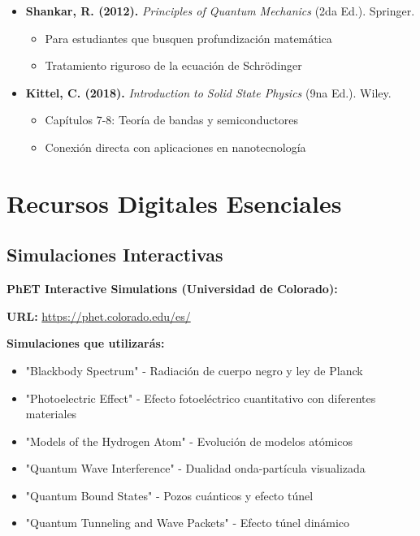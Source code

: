 \begin{tecnologiabox}
\begin{tecnologiabox}
\begin{tecnologiabox}
\begin{itemize}
	\item \textbf{Shankar, R. (2012).} \textit{Principles of Quantum Mechanics} (2da Ed.). Springer.
	\begin{itemize}
		\item Para estudiantes que busquen profundización matemática
		\item Tratamiento riguroso de la ecuación de Schrödinger
	\end{itemize}
	
	\item \textbf{Kittel, C. (2018).} \textit{Introduction to Solid State Physics} (9na Ed.). Wiley.
	\begin{itemize}
		\item Capítulos 7-8: Teoría de bandas y semiconductores
		\item Conexión directa con aplicaciones en nanotecnología
	\end{itemize}
\end{itemize}

\section{Recursos Digitales Esenciales}

\subsection{Simulaciones Interactivas}

\begin{tecnologiabox}
	\textbf{PhET Interactive Simulations (Universidad de Colorado):}
	
	\textbf{URL:} \url{https://phet.colorado.edu/es/}
	
	\textbf{Simulaciones que utilizarás:}
	\begin{itemize}
		\item "Blackbody Spectrum" - Radiación de cuerpo negro y ley de Planck
		\item "Photoelectric Effect" - Efecto fotoeléctrico cuantitativo con diferentes materiales
		\item "Models of the Hydrogen Atom" - Evolución de modelos atómicos
		\item "Quantum Wave Interference" - Dualidad onda-partícula visualizada
		\item "Quantum Bound States" - Pozos cuánticos y efecto túnel
		\item "Quantum Tunneling and Wave Packets" - Efecto túnel dinámico
	\end{itemize}
\end{tecnologiabox}


\end{tecnologiabox}
\end{tecnologiabox}
\end{tecnologiabox}
